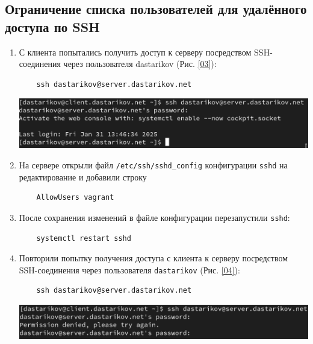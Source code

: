 \subsection{Ограничение списка пользователей для удалённого доступа по SSH}
\begin{enumerate}
\item С клиента попытались получить доступ к серверу посредством SSH-соединения через пользователя dastarikov (Рис. \ref{03}):
  \begin{verbatim}
    ssh dastarikov@server.dastarikov.net
  \end{verbatim}
\begin{center}
  \centering
  \includegraphics[width=\textwidth]{../images/image03.png}
  \label{03}
\end{center}

\item На сервере открыли файл \texttt{/etc/ssh/sshd\_config} конфигурации \texttt{sshd} на редактирование и добавили строку
  \begin{verbatim}
    AllowUsers vagrant
  \end{verbatim}
\item После сохранения изменений в файле конфигурации перезапустили \texttt{sshd}:
  \begin{verbatim}
    systemctl restart sshd
  \end{verbatim}
\item Повторили попытку получения доступа с клиента к серверу посредством SSH-соединения через пользователя \texttt{dastarikov} (Рис. \ref{04}):
  \begin{verbatim}
    ssh dastarikov@server.dastarikov.net
  \end{verbatim}
\begin{center}
  \centering
  \includegraphics[width=\textwidth]{../images/image04.png}
  \label{04}
\end{center}


\end{enumerate}
